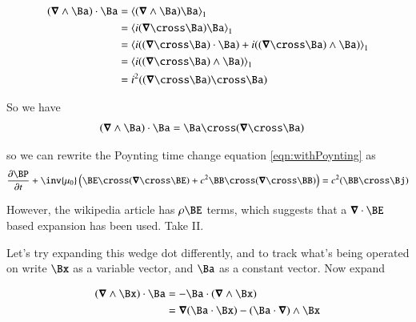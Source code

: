 \documentclass{article}
\begin{document}
\begin{align*}
(\spacegrad \wedge \Ba) \cdot \Ba
&= \gpgradeone{(\spacegrad \wedge \Ba) \Ba } \\
&= \gpgradeone{i (\spacegrad \cross \Ba) \Ba } \\
&= \gpgradeone{i ((\spacegrad \cross \Ba) \cdot \Ba) + i ((\spacegrad \cross \Ba) \wedge \Ba) } \\
&= \gpgradeone{i ((\spacegrad \cross \Ba) \wedge \Ba) } \\
&= i^2 ((\spacegrad \cross \Ba) \cross \Ba) \\
\end{align*}

So we have
\begin{align}
(\spacegrad \wedge \Ba) \cdot \Ba &= \Ba \cross (\spacegrad \cross \Ba)
\end{align}

so we can rewrite the Poynting time change equation \ref{eqn:withPoynting} as
\begin{align}
\PD{t}{\BP} + \inv{\mu_0}
\left( \BE \cross (\spacegrad \cross \BE) + c^2 \BB \cross (\spacegrad \cross \BB) \right)
 = c^2 (\BB \cross \Bj)
\end{align}

However, the wikipedia article has $\rho \BE$ terms, which suggests that a $\spacegrad \cdot \BE$ based expansion has been used.  Take II.

Let's try expanding this wedge dot differently, and to track what's being operated on write $\Bx$ as a variable vector, and
$\Ba$ as a constant vector.  Now expand

\begin{align*}
(\spacegrad \wedge \Bx) \cdot \Ba
&= - \Ba \cdot (\spacegrad \wedge \Bx) \\
&= \spacegrad (\Ba \cdot \Bx) - (\Ba \cdot \spacegrad) \wedge \Bx \\
\end{align*}
\end{document}
